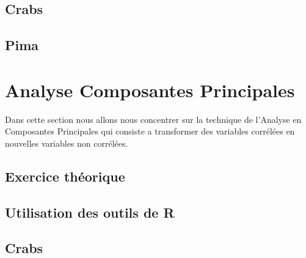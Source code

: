 \documentclass[10pt]{article}
\begin{document}
\subsection{Crabs}

\subsection{Pima}
\pagebreak

\section{Analyse Composantes Principales}
Dans cette section nous allons nous concentrer sur la technique de l’Analyse en Composantes Principales qui consiste a transformer des variables corrélées en nouvelles variables non corrélées.
 \subsection{Exercice théorique}
\subsection{Utilisation des outils de R}
\subsection{Crabs}
\end{document}
